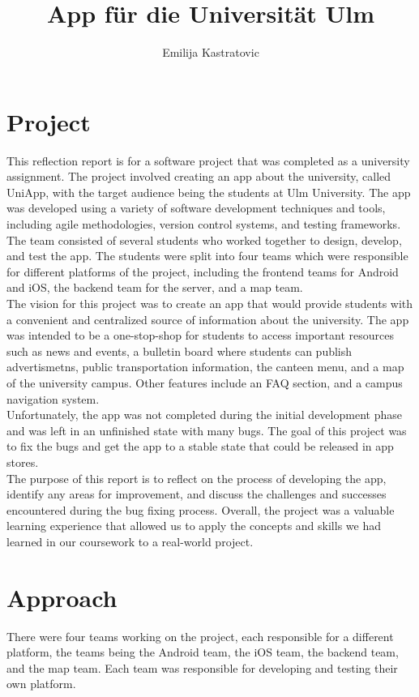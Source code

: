 \documentclass[sf-font,usefira,english]{uulm/sp/article}
\title{App für die Universität Ulm}
\author{Emilija Kastratovic}
\begin{document}
\maketitle
\section{Project}

This reflection report is for a software project that was completed as a university assignment. 
The project involved creating an app about the university, called UniApp, 
with the target audience being the students at Ulm University.
The app was developed using a variety of software development techniques and tools, 
including agile methodologies, version control systems, and testing frameworks. 
The team consisted of several students who worked together to design, develop, and test the app.
The students were split into four teams which were responsible for different platforms of the project, including the
frontend teams for Android and iOS, the backend team for the server, and a map team.\\

The vision for this project was to create an app that would provide students 
with a convenient and centralized source of information about the university. 
The app was intended to be a one-stop-shop for students to access 
important resources such as news and events, a bulletin board where students
can publish advertismetns, public transportation information, the canteen menu,
and a map of the university campus. Other features include an FAQ section, 
and a campus navigation system. \\

Unfortunately, the app was not completed during the initial development phase 
and was left in an unfinished state with many bugs.
The goal of this project was to fix the bugs and get the app to a stable state 
that could be released in app stores. \\

The purpose of this report is to reflect on the process 
of developing the app, identify any areas for improvement, 
and discuss the challenges and successes encountered during the bug fixing process.
Overall, the project was a valuable learning experience that allowed us to 
apply the concepts and skills we had learned in our coursework to a real-world project. \\

\section{Approach}
There were four teams working on the project, each responsible for a different platform,
the teams being the Android team, the iOS team, the backend team, and the map team.
Each team was responsible for developing and testing their own platform.\\
\end{document}
